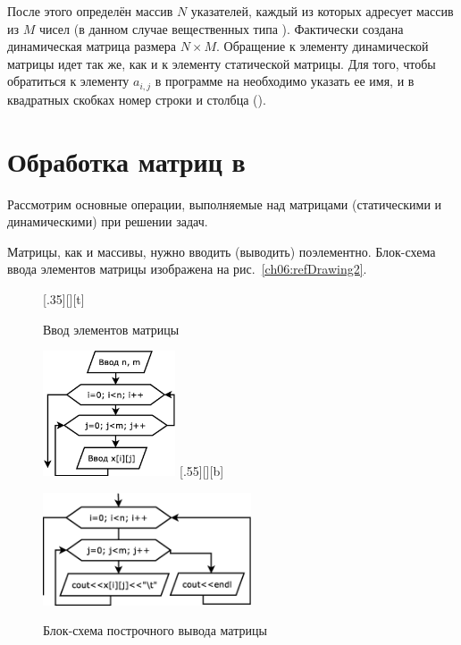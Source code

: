 После этого определён массив $N$ указателей, каждый из которых адресует массив из $M$ чисел (в данном
случае вещественных типа ). Фактически создана динамическая матрица размера $N\times M$.
Обращение к элементу
динамической матрицы идет так же, как и к элементу статической матрицы. Для того, чтобы обратиться к элементу 
$a_{i,j}$ в программе на  необходимо указать ее имя, и в квадратных скобках номер строки 
и столбца ().

\section[Обработка матриц в \Sys{С(С++)}]{Обработка матриц в }
Рассмотрим основные операции, выполняемые над матрицами (статическими и динамическими) при решении задач.

Матрицы, как и массивы, нужно вводить (выводить) поэлементно. Блок-схема ввода элементов матрицы  изображена на
рис.~\ref{ch06:refDrawing2}.

\begin{figure}[H]
\begin{floatrow}
[.35\textwidth][\FBheight][t]
{\caption{Ввод элементов матрицы}
\label{ch06:refDrawing2}}
{\includegraphics[width=0.35\textwidth,keepaspectratio]{img/ris_6_3}}\hspace*{0.05\textwidth}
%
[.55\textwidth][\FBheight][b]
{\caption{Блок-схема построчного вывода матрицы}
\label{ch06:refDrawing3}}
{\includegraphics[width=0.55\textwidth,keepaspectratio]{img/ris_6_4}}
\end{floatrow}
\end{figure}


